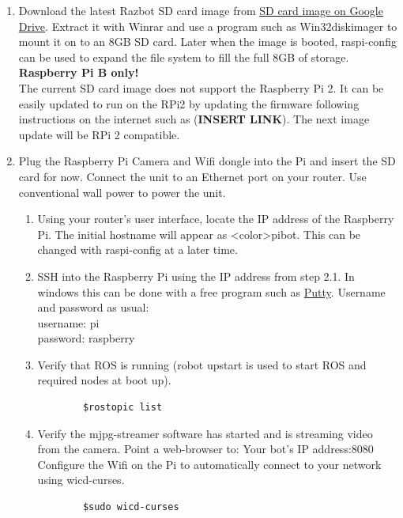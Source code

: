 \documentclass[12pt,titlepage,oneside]{memoir}
\begin{document}
\begin{enumerate}

\item Download the latest Razbot SD card image from \href{https://drive.google.com/file/d/0B4yfrdhk2e0OVlA1alJoRXBPeXM/view?usp=sharing}{SD card image on Google Drive}. Extract it with Winrar and use a program such as Win32diskimager to mount it on to an 8GB SD card. Later when the image is booted, raspi-config can be used to expand the file system to fill the full 8GB of storage.\\
\textbf{Raspberry Pi B only!}\\
The current SD card image does not support the Raspberry Pi 2. It can be easily updated to run on the RPi2 by updating the firmware following instructions on the internet such as (\textbf{INSERT LINK}). The next image update will be RPi 2 compatible.

\item Plug the Raspberry Pi Camera and Wifi dongle into the Pi and insert the SD card for now. Connect the unit to an Ethernet port on your router. Use conventional wall power to power the unit.
	\begin{enumerate}
	\item  Using your router's user interface, locate the IP address of the Raspberry Pi. The initial hostname will appear as <color>pibot. This can be changed with raspi-config at a later time.
	\item SSH into the Raspberry Pi using the IP address from step 2.1. In windows this can be done with a free program such as \href{http://www.chiark.greenend.org.uk/~sgtatham/putty/download.html}{Putty}. Username and 			password as usual:\\
	username: pi\\
	password: raspberry\\
	\item Verify that ROS is running (robot upstart is used to start ROS and required nodes at boot up).\\
	\begin{verbatim}
		$rostopic list
	\end{verbatim}
	\item Verify the mjpg-streamer software has started and is streaming video from the camera. Point a web-browser to: Your bot's IP address:8080
	Configure the Wifi on the Pi to automatically connect to your network using wicd-curses.
	\begin{verbatim}
		$sudo wicd-curses
	\end{verbatim}
	\end{enumerate}


\end{enumerate}
\end{document}
